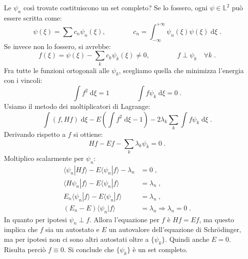\documentclass[12pt,a4paper]{report}
\theoremstyle{definition}
\numberwithin{equation}{section}
\newcommand{\diff}[1][]{\mathrm{d}#1}
\newcommand{\bra}{\langle}
\newcommand{\ket}{\rangle}
\newcommand{\Sch}{Schrödinger}
\begin{document}
Le $\psi_n$ così trovate costituiscono un set completo? Se lo fossero, ogni $\psi\in\mathbb{L}^2$ può essere scritta come:
$$
\psi(\xi)=\sum c_n\psi_n(\xi), \qquad\qquad c_n=\int_{-\infty}^{+\infty}\psi_n(\xi)\psi(\xi)\;\diff{\xi}\;.
$$
Se invece non lo fossero, si avrebbe:
\begin{equation}
f(\xi)=\psi(\xi)-\sum_k c_k\psi_k(\xi)\ne 0,\qquad\qquad f\perp\psi_k\quad\forall k\;.
\end{equation}
Fra tutte le funzioni ortogonali alle $\psi_k$, scegliamo quella che minimizza l'energia con i vincoli:
$$
\int f^2\;\diff{\xi}=1 \qquad\qquad \int f\psi_k\;\diff{\xi}=0\;.
$$
Usiamo il metodo dei moltiplicatori di Lagrange:
\begin{equation}
\int (f,Hf)\;\diff{\xi}-E\left(\int f^2\;\diff{\xi} -1\right)-2\lambda_k\sum_k\int f\psi_k\;\diff{\xi}\;.
\end{equation}
Derivando rispetto a $f$ si ottiene:
\begin{equation}
Hf-Ef-\sum_k\lambda_k\psi_k=0\;.
\end{equation}
Moltiplico scalarmente per $\psi_n$:
\begin{align*}
\bra\psi_n|Hf\ket-E\bra\psi_n|f\ket-\lambda_n &= 0\;, \\
\bra H\psi_n|f\ket-E\bra\psi_n|f\ket &=\lambda_n\;, \\
E_n\bra\psi_n|f\ket-E\bra\psi_n|f\ket &= \lambda_n\;, \\
(E_n-E)\bra\psi_n|f\ket &=\lambda_n \Longrightarrow \lambda_n=0\;.
\end{align*}
In quanto per ipotesi $\psi_n\perp f$. Allora l'equazione per $f$ è $Hf=Ef$, ma questo implica che $f$ sia un autostato e $E$ un autovalore dell'equazione di \Sch, ma per ipotesi non ci sono altri autostati oltre a $\{\psi_k\}$. Quindi anche $E=0$. Risulta perciò $f\equiv 0$. Si conclude che $\{\psi_k\}$ è un set completo.
\end{document}
